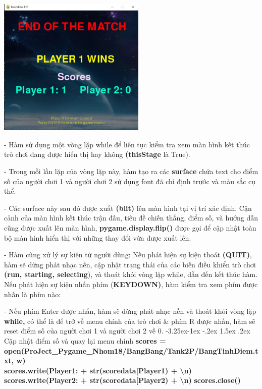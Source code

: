 \documentclass[a4paper]{article}
\makeatletter
\newcounter {subsubsubsection}[subsubsection]
\newcommand\subsubsubsection{\@startsection{subsubsubsection}{4}{\z@}%
                                     {-3.25ex\@plus -1ex \@minus -.2ex}%
                                     {1.5ex \@plus .2ex}%
                                     {\normalfont\normalsize\bfseries}}
\makeatother
\begin{document}
\includegraphics[width=2.76667in,height=2.60694in]{image60.png}

- Hàm sử dụng một vòng lặp while để liên tục kiểm tra xem màn hình kết
thúc trò chơi đang được hiển thị hay không \textbf{(thisStage} là True).

- Trong mỗi lần lặp của vòng lặp này, hàm tạo ra các \textbf{surface}
chứa text cho điểm số của người chơi 1 và người chơi 2 sử dụng font đã
chỉ định trước và màu sắc cụ thể.

- Các surface này sau đó được xuất \textbf{(blit)} lên màn hình tại vị
trí xác định. Cận cảnh của màn hình kết thúc trận đấu, tiêu đề chiến
thắng, điểm số, và hướng dẫn cũng được xuất lên màn hình,
\textbf{pygame.display.flip()} được gọi để cập nhật toàn bộ màn hình
hiển thị với những thay đổi vừa được xuất lên.

- Hàm cũng xử lý sự kiện từ người dùng: Nếu phát hiện sự kiện thoát
\textbf{(QUIT)}, hàm sẽ dừng phát nhạc nền, cập nhật trạng thái của các
biến điều khiển trò chơi \textbf{(run, starting, selecting}), và thoát
khỏi vòng lặp while, dẫn đến kết thúc hàm. Nếu phát hiện sự kiện nhấn
phím (\textbf{KEYDOWN)}, hàm kiểm tra xem phím được nhấn là phím nào:

- Nếu phím Enter được nhấn, hàm sẽ dừng phát nhạc nền và thoát khỏi vòng
lặp \textbf{while,} có thể là để trở về menu chính của trò chơi \& phím
R được nhấn, hàm sẽ reset điểm số của người chơi 1 và người chơi 2 về 0.
\subsubsubsection{ Cập nhật điểm số và quay lại menu chính}
\textbf{scores =
open(\textquotesingle ProJect\_Pygame\_Nhom18/BangBang/Tank2P/BangTinhDiem.txt\textquotesingle,
\textquotesingle w\textquotesingle)}\\
\textbf{scores.write(\textquotesingle Player1: \textquotesingle{} +
str(scoredata{[}\textquotesingle Player1\textquotesingle{]}) +
\textquotesingle\textbackslash n\textquotesingle)}\\
\textbf{scores.write(\textquotesingle Player2: \textquotesingle{} +
str(scoredata{[}\textquotesingle Player2\textquotesingle{]}) +
\textquotesingle\textbackslash n\textquotesingle)}
\textbf{scores.close()}
\end{document}
